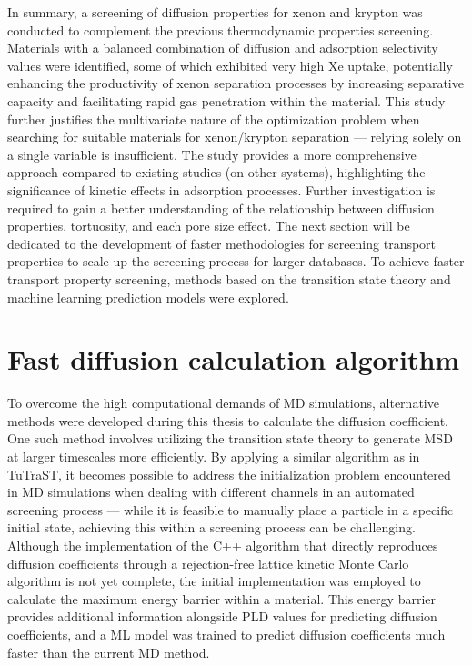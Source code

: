 \documentclass[main]{subfiles}
\begin{document}
In summary, a screening of diffusion properties for xenon and krypton was conducted to complement the previous thermodynamic properties screening. Materials with a balanced combination of diffusion and adsorption selectivity values were identified, some of which exhibited very high Xe uptake, potentially enhancing the productivity of xenon separation processes by increasing separative capacity and facilitating rapid gas penetration within the material. This study further justifies the multivariate nature of the optimization problem when searching for suitable materials for xenon/krypton separation --- relying solely on a single variable is insufficient. The study provides a more comprehensive approach compared to existing studies (on other systems), highlighting the significance of kinetic effects in adsorption processes.\autocite{Stanton_2022} Further investigation is required to gain a better understanding of the relationship between diffusion properties, tortuosity, and each pore size effect. The next section will be dedicated to the development of faster methodologies for screening transport properties to scale up the screening process for larger databases. To achieve faster transport property screening, methods based on the transition state theory and machine learning prediction models were explored.

\section{Fast diffusion calculation algorithm}\label{sct:algo_diff}

To overcome the high computational demands of MD simulations, alternative methods were developed during this thesis to calculate the diffusion coefficient. One such method involves utilizing the transition state theory to generate MSD at larger timescales more efficiently. By applying a similar algorithm as in TuTraST, it becomes possible to address the initialization problem encountered in MD simulations when dealing with different channels in an automated screening process --- while it is feasible to manually place a particle in a specific initial state, achieving this within a screening process can be challenging. Although the implementation of the C++ algorithm that directly reproduces diffusion coefficients through a rejection-free lattice kinetic Monte Carlo algorithm is not yet complete, the initial implementation was employed to calculate the maximum energy barrier within a material. This energy barrier provides additional information alongside PLD values for predicting diffusion coefficients, and a ML model was trained to predict diffusion coefficients much faster than the current MD method.
\end{document}
